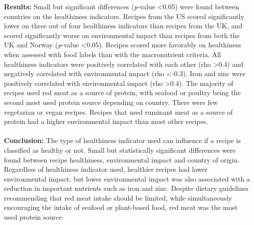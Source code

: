 \textbf{Results:} Small but significant differences (\emph{p}-value <0.05) were found between countries on the healthiness indicators. Recipes from the US scored significantly lower on three out of four healthiness indicators than recipes from the UK, and scored significantly worse on environmental impact than recipes from both the UK and Norway (\emph{p}-value <0.05). Recipes scored more favorably on healthiness when assessed with food labels than with the macronutrient criteria. All healthiness indicators were positively correlated with each other (rho >0.4) and negatively correlated with environmental impact (rho <-0.3). Iron and zinc were positively correlated with environmental impact (rho >0.4). The majority of recipes used red meat as a source of protein, with seafood or poultry being the second most used protein source depending on country. There were few vegetarian or vegan recipes. Recipes that used ruminant meat as a source of protein had a higher environmental impact than most other recipes.\\\\
\textbf{Conclusion:} The type of healthiness indicator used can influence if a recipe is classified as healthy or not. Small but statistically significant differences were found between recipe healthiness, environmental impact and country of origin. Regardless of healthiness indicator used, healthier recipes had lower environmental impact, but lower environmental impact was also associated with a reduction in important nutrients such as iron and zinc. Despite dietary guidelines recommending that red meat intake should be limited, while simultaneously encouraging the intake of seafood or plant-based food, red meat was the most used protein source.
\pagebreak
